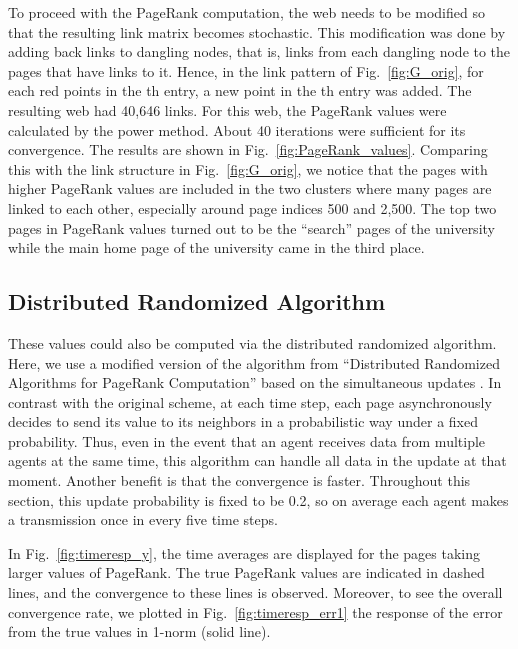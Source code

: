 \documentclass[11pt,draftcls,onecolumn]{IEEEtran}
\begin{document}
\begin{table}[t]
To proceed with the PageRank computation, the web needs to be modified
so that the resulting link matrix  becomes stochastic. 
This modification was done by adding back links to dangling nodes, that is, links from each dangling 
node to the pages that have links to it. 
Hence, in the link pattern of Fig.~\ref{fig:G_orig},
for each red points in the th entry, a new point in the th entry was added.
The resulting web had 40,646 links.
For this web, the PageRank values were calculated by the power method. 
About 40 iterations were sufficient for its convergence. 
The results are shown in Fig.~\ref{fig:PageRank_values}. Comparing this with the
link structure in Fig.~\ref{fig:G_orig}, we notice that the pages with higher PageRank
values are included in the two clusters where many pages are linked to each other,
especially around page indices 500 and 2,500.
The top two pages in PageRank values turned out to be the ``search'' pages of the university
while the main home page of the university came in the third place. 



\subsection*{Distributed Randomized Algorithm}

These values could also be computed via the distributed randomized algorithm.
Here, we use a modified version of the algorithm from 
``Distributed Randomized Algorithms for PageRank Computation''
based on the simultaneous updates \cite{IshTem:10}. 
In contrast with the original scheme,  
at each time step,
each page asynchronously decides to send its value to its neighbors 
in a probabilistic way under a fixed probability. 
Thus, even in the event that an agent receives data from
multiple agents at the same time, this algorithm can handle all data in
the update at that moment.
Another benefit is that the convergence is faster. 
Throughout this section, this update
probability is fixed to be 0.2, so on average each agent makes a transmission
once in every five time steps. 


In Fig.~\ref{fig:timeresp_y}, the time averages 
are displayed for the pages taking larger values of PageRank. The true PageRank values
are indicated in dashed lines, and the convergence to these lines is observed.
Moreover, to see the overall convergence rate, we plotted in Fig.~\ref{fig:timeresp_err1}
the response of the error  from the true values in 1-norm (solid line).



\end{table}
\end{document}
